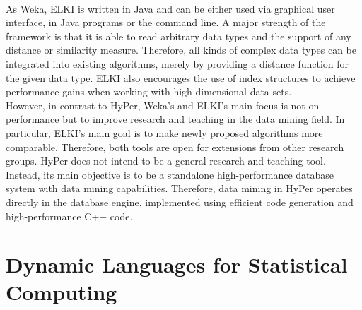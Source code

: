 \\
As Weka, ELKI is written in Java and can be either used via graphical user interface, in Java programs or the command line. A major strength of the framework is that it is able to read arbitrary data types and the support of any distance or similarity measure. Therefore, all kinds of complex data types can be integrated into existing algorithms, merely by providing a distance function for the given data type. ELKI also encourages the use of index structures to achieve performance gains when working with high dimensional data sets. 
\\
However, in contrast to HyPer, Weka's and ELKI's main focus is not on performance but to improve research and teaching in the data mining field. In particular, ELKI's main goal is to make newly proposed algorithms more comparable. Therefore, both tools are open for extensions from other research groups. HyPer does not intend to be a general research and teaching tool. Instead, its main objective is to be a standalone high-performance database system with data mining capabilities. Therefore, data mining in HyPer operates directly in the database engine, implemented using efficient code generation and high-performance C++ code.


\section{Dynamic Languages for Statistical Computing}


